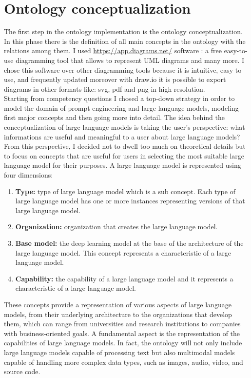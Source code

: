 \section{Ontology conceptualization}
The first step in the ontology implementation is the ontology conceptualization. In this phase there is the definition of all main concepts in the ontology with the relations among them. I used \href{draw.io}{https://app.diagrams.net/} software : a free easy-to-use diagramming tool that allows to represent UML diagrams and many more. I chose this software over other diagramming tools because it is intuitive, easy to use, and frequently updated moreover with draw.io it is possible to export diagrams in other formats like: svg, pdf and png in high resolution.\\
Starting from competency questions I chosed a top-down strategy in order to model the domain of prompt engineering and large language models, modeling first major concepts and then going more into detail. The idea behind the conceptualization of large language models is  taking the user's perspective: what informations are useful and meaningful to a user about large language models? From this perspective, I decided not to dwell too much on theoretical details but to focus on concepts that are useful for users in selecting the most suitable large language model for their purposes. A large language model is represented using four dimensions:
\begin{enumerate}
    \item \textbf{Type:} type of large language model which is a sub concept. Each type of large language model has one or more instances representing versions of that large language model.

    \item \textbf{Organization:} organization that creates the large language model.

    \item \textbf{Base model:} the deep learning model at the base of the architecture of the large language model. This concept represents a characteristic of a large language model.

    \item \textbf{Capability:} the capability of a large language model and it represents a characteristic of a large language model.
\end{enumerate}
These concepts provide a representation of various aspects of large language models, from their underlying architecture to the organizations that develop them, which can range from universities and research institutions to companies with business-oriented goals. A fundamental aspect is the representation of the capabilities of large language models. In fact, the ontology will not only include large language models capable of processing text but also multimodal models capable of handling more complex data types, such as images, audio, video, and source code.\\
